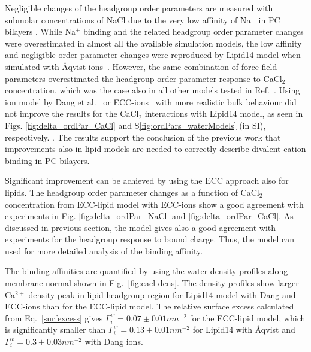 \documentclass[aip,jcp,twocolumn]{revtex4}
\begin{document}

Negligible changes of the headgroup order parameters are measured
with submolar concentrations of NaCl due to the very low affinity of Na$^+$
in PC bilayers \cite{akutsu81}. While Na$^+$ binding and the related 
headgroup order parameter changes were overestimated in
almost all the available simulation models, the low affinity
and negligible order parameter changes were reproduced by Lipid14 
model when simulated with \AA{}qvist ions~\cite{catte16}.
However, the same combination of force field parameters
overestimated the headgroup order parameter response to CaCl$_2$ 
concentration, which was the case also in all other models tested in
Ref.~.
Using ion model by Dang et al.~\cite{smith94,chang1999,dang2006} or
ECC-ions~\cite{jungwirth17-new-paper-to-be-published, kohagen16, Pluharova2014}
with more realistic bulk behaviour did not improve the results
for the CaCl$_2$ interactions with Lipid14 model, as seen 
in Figs. \ref{fig:delta_ordPar_CaCl} and S\ref{fig:ordPars_waterModels} (in SI), respectively.
.
The results support the conclusion of the previous work \cite{catte16}
that improvements also in lipid models are needed to 
correctly describe divalent cation binding in PC bilayers.

Significant improvement can be achieved by using the ECC
approach also for lipids. The headgroup order parameter changes
as a function of CaCl$_2$ concentration from ECC-lipid model with ECC-ions
show a good agreement with experiments in Fig. \ref{fig:delta_ordPar_NaCl} and \ref{fig:delta_ordPar_CaCl}.
As discussed in previous section, the model gives also
a good agreement with experiments for
the headgroup response to bound charge.
Thus, the model can used for more detailed analysis of the
binding affinity.


The binding affinities are quantified by using
the water density profiles along membrane normal shown
in Fig.~\ref{fig:cacl-dens}. The density profiles show
larger Ca$^{2+}$ density peak in lipid headgroup region for
Lipid14 model with Dang and ECC-ions than for the ECC-lipid model.
The relative surface excess calculated from Eq.~\ref{surfexcess} gives 
$\Gamma_i^w = 0.07 \pm 0.01 nm^{-2}$ for the ECC-lipid model,
which is significantly smaller than $\Gamma_i^w = 0.13 \pm 0.01 nm^{-2}$ for
Lipid14 with \AA{}qvist and $\Gamma_i^w = 0.3 \pm 0.03 nm^{-2}$ with Dang ions.
\end{document}
